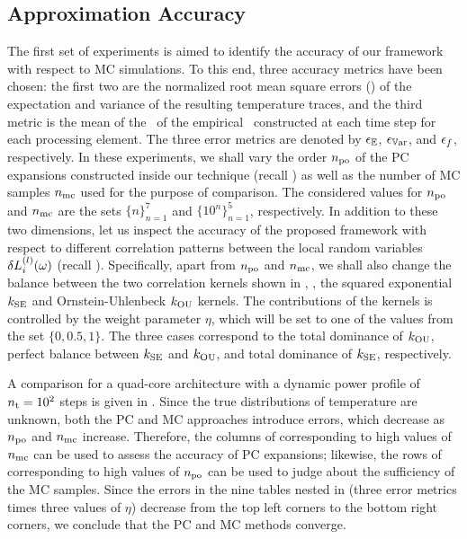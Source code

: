 \subsection{Approximation Accuracy} 
The first set of experiments is aimed to identify the accuracy of our framework with respect to MC simulations.
To this end, three accuracy metrics have been chosen: the first two are the normalized root mean square errors (\nrmses) of the expectation and variance of the resulting temperature traces, and the third metric is the mean of the \nrmses\ of the empirical \pdfs\ constructed at each time step for each processing element.
The three error metrics are denoted by $\epsilon_\mathbb{E}$, $\epsilon_{\mathbb{V}\text{ar}}$, and $\epsilon_f$, respectively.
In these experiments, we shall vary the order ${n_\text{po}}$ of the PC expansions constructed inside our technique (recall ) as well as the number of MC samples ${n_\text{mc}}$ used for the purpose of comparison.
The considered values for ${n_\text{po}}$ and ${n_\text{mc}}$ are the sets $\{ n \}_{n = 1}^7$ and $\{ 10^n \}_{n = 1}^5$, respectively.
In addition to these two dimensions, let us inspect the accuracy of the proposed framework with respect to different correlation patterns between the local random variables $\delta L^{(l)}_i(\omega)$ (recall ).
Specifically, apart from ${n_\text{po}}$ and ${n_\text{mc}}$, we shall also change the balance between the two correlation kernels shown in , \ie, the squared exponential $\fCorr_\SE$ and Ornstein-Uhlenbeck $\fCorr_\OU$ kernels.
The contributions of the kernels is controlled by the weight parameter $\eta$, which will be set to one of the values from the set $\{ 0, 0.5, 1 \}$.
The three cases correspond to the total dominance of $\fCorr_\OU$, perfect balance between $\fCorr_\SE$ and $\fCorr_\OU$, and total dominance of $\fCorr_\SE$, respectively.


A comparison for a quad-core architecture with a dynamic power profile of ${n_\text{t}} = 10^2$ steps is given in .
Since the true distributions of temperature are unknown, both the PC and MC approaches introduce errors, which decrease as ${n_\text{po}}$ and ${n_\text{mc}}$ increase.
Therefore, the columns of  corresponding to high values of ${n_\text{mc}}$ can be used to assess the accuracy of PC expansions; likewise, the rows of  corresponding to high values of ${n_\text{po}}$ can be used to judge about the sufficiency of the MC samples.
Since the errors in the nine tables nested in  (three error metrics times three values of $\eta$) decrease from the top left corners to the bottom right corners, we conclude that the PC and MC methods converge.

